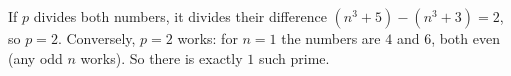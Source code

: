 If $p$ divides both numbers, it divides their difference $(n^3+5)-(n^3+3)=2$, so $p=2$. Conversely, $p=2$ works: for $n=1$ the numbers are $4$ and $6$, both even (any odd $n$ works). So there is exactly $\boxed{1}$ such prime.
